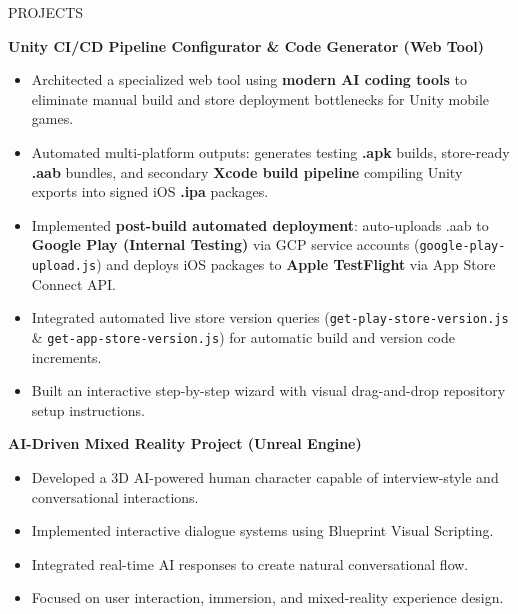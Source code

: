 \documentclass{resume} %
\begin{document}
\begin{rSection}{PROJECTS}

\textbf{Unity CI/CD Pipeline Configurator \& Code Generator (Web Tool)}
\begin{itemize}
    \itemsep -3pt {}
     \item Architected a specialized web tool using \textbf{modern AI coding tools} to eliminate manual build and store deployment bottlenecks for Unity mobile games.
     \item Automated multi-platform outputs: generates testing \textbf{.apk} builds, store-ready \textbf{.aab} bundles, and secondary \textbf{Xcode build pipeline} compiling Unity exports into signed iOS \textbf{.ipa} packages.
     \item Implemented \textbf{post-build automated deployment}: auto-uploads .aab to \textbf{Google Play (Internal Testing)} via GCP service accounts (\texttt{google-play-upload.js}) and deploys iOS packages to \textbf{Apple TestFlight} via App Store Connect API.
     \item Integrated automated live store version queries (\texttt{get-play-store-version.js} \& \texttt{get-app-store-version.js}) for automatic build and version code increments.
     \item Built an interactive step-by-step wizard with visual drag-and-drop repository setup instructions.
\end{itemize}

\textbf{AI-Driven Mixed Reality Project (Unreal Engine)}
\begin{itemize}
    \itemsep -3pt {}
     \item Developed a 3D AI-powered human character capable of interview-style and conversational interactions.
     \item Implemented interactive dialogue systems using Blueprint Visual Scripting.
     \item Integrated real-time AI responses to create natural conversational flow.
     \item Focused on user interaction, immersion, and mixed-reality experience design.
\end{itemize}


\end{rSection}
\end{document}
